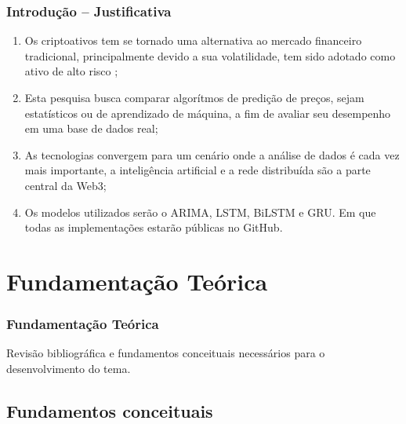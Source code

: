 \documentclass[aspectratio=169]{beamer}
\begin{document}
\begin{frame}[fragile] \frametitle{Introdução -- Justificativa}
	\begin{enumerate}

    \item Os criptoativos tem se tornado uma alternativa ao mercado financeiro tradicional, principalmente devido a sua volatilidade, tem sido adotado como ativo de alto risco \cite{Sousa};
			
		\item Esta pesquisa busca comparar algorítmos de predição de preços, sejam estatísticos ou de aprendizado de máquina, a fim de avaliar seu desempenho em uma base de dados real;
			
		\item As tecnologias convergem para um cenário onde a análise de dados é cada vez mais importante, a inteligência artificial e a rede distribuída são a parte central da Web3;
		
    \item Os modelos utilizados serão o ARIMA, LSTM, BiLSTM e GRU. Em que todas as implementações estarão públicas no GitHub.
		
    \end{enumerate}
\end{frame}


\section{Fundamentação Teórica}

\begin{frame} \frametitle{Fundamentação Teórica}
	\begin{center}
		Revisão bibliográfica e fundamentos conceituais necessários para o desenvolvimento do tema.
	\end{center}
\end{frame}





\subsection{Fundamentos conceituais}
\end{document}
